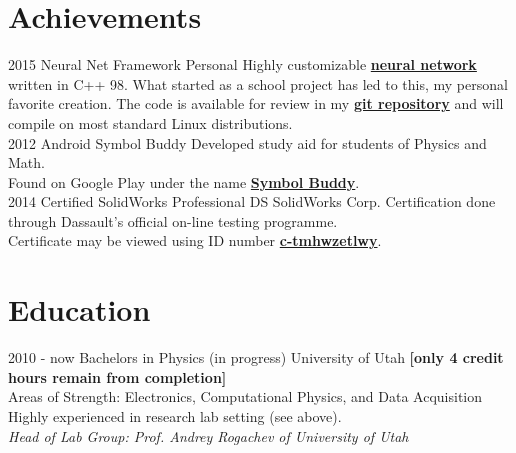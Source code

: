 \documentclass[]{friggeri-cv}
\begin{document}
\section{Achievements}
\begin{entrylist}
	\entry
		{\hphantom{1234}2015} %
		{Neural Net Framework}
		{Personal}
		{Highly customizable \href{https://en.wikipedia.org/wiki/Artificial_neural_network}{\textbf{neural network}} written in C++ 98. What started as a school project has led to this, my personal favorite creation. The code is available for review in my \href{https://github.com/TheHumanParacite/SeaPlusPlus-Projects/tree/master/NeuralNet}{\textbf{git repository}} and will compile on most standard Linux distributions.\\}
	\entry
		{\hphantom{1234}2012}
		{Android}
		{Symbol Buddy}
		{Developed study aid for students of Physics and Math.\\
		Found on Google Play under the name \href{https://play.google.com/store/apps/details?id=org.paracite.symbolbuddy}{\textbf{Symbol Buddy}}.\\}
	\entry
		{\hphantom{1234}2014}
		{Certified SolidWorks Professional}
		{DS SolidWorks Corp.}
		{Certification done through Dassault's official on-line testing programme.\\ 
		Certificate may be viewed using ID number \href{https://solidworks.virtualtester.com/validate_button}{\textbf{c-tmhwzetlwy}}.\\}
		
\end{entrylist}

\section{Education}
\begin{entrylist}
	\entry
		{2010 - \hphantom{12}now}
		{Bachelors in Physics (in progress)}
		{University of Utah}
		{\textbf{[only 4 credit hours remain from completion]}\\
		Areas of Strength: Electronics, Computational Physics, and Data Acquisition\\
		Highly experienced in research lab setting (see above).\\
		{\emph{Head of Lab Group: Prof. Andrey Rogachev of University of Utah}\\}}		

\end{entrylist}
\end{document}
